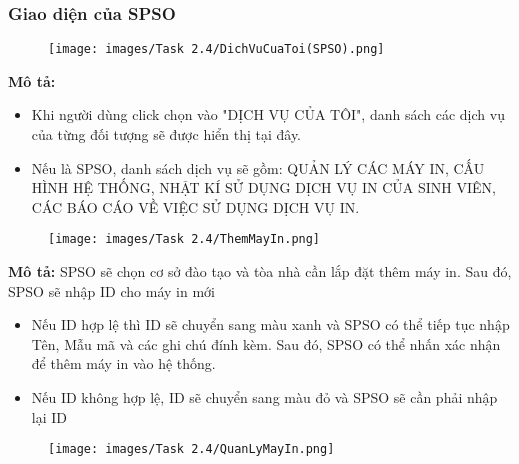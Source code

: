     \newpage
    \subsubsection{Giao diện của SPSO}
    \begin{center}
    \begin{figure}[!htp]
    \begin{center}
     \texttt{[image: images/Task 2.4/DichVuCuaToi(SPSO).png]}
    \end{center}
    \label{refhinh1}
    \end{figure}
    \end{center}

    \textbf{Mô tả:}
    \begin{itemize}
    \item Khi người dùng click chọn vào "DỊCH VỤ CỦA TÔI", danh sách các dịch vụ của từng đối tượng sẽ được hiển thị tại đây.
    \item Nếu là SPSO, danh sách dịch vụ sẽ gồm: QUẢN LÝ CÁC MÁY IN, CẤU HÌNH HỆ THỐNG, NHẬT KÍ SỬ DỤNG DỊCH VỤ IN CỦA SINH VIÊN, CÁC BÁO CÁO VỀ VIỆC SỬ DỤNG DỊCH VỤ IN.
    \end{itemize}

    \newpage
    \begin{center}
    \begin{figure}[!htp]
    \begin{center}
     \texttt{[image: images/Task 2.4/ThemMayIn.png]}
    \end{center}
    \label{refhinh1}
    \end{figure}
    \end{center}

    \textbf{Mô tả:}
    SPSO sẽ chọn cơ sở đào tạo và tòa nhà cần lắp đặt thêm máy in. Sau đó, SPSO sẽ nhập ID cho máy in mới
    \begin{itemize}
        \item Nếu ID hợp lệ thì ID sẽ chuyển sang màu xanh và SPSO có thể tiếp tục nhập Tên, Mẫu mã và các ghi chú đính kèm. Sau đó, SPSO có thể nhấn xác nhận để thêm máy in vào hệ thống.
        \item Nếu ID không hợp lệ, ID sẽ chuyển sang màu đỏ và SPSO sẽ cần phải nhập lại ID
    \end{itemize} 
    
    \newpage
    \begin{center}
    \begin{figure}[!htp]
    \begin{center}
     \texttt{[image: images/Task 2.4/QuanLyMayIn.png]}
    \end{center}
    \label{refhinh1}
    \end{figure}
    \end{center}

